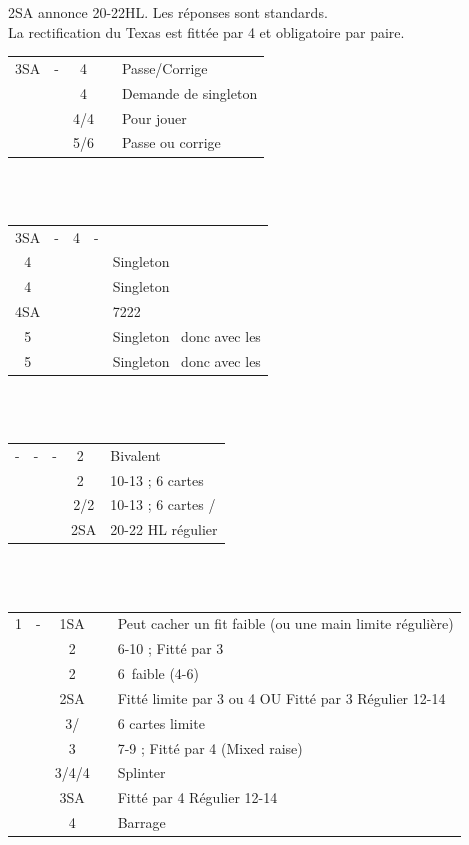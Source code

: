 \documentclass[a4paper, oneside, 11pt]{report}
\begin{document}
	2SA annonce 20-22HL. Les réponses sont standards. \\
La rectification du Texas est fittée par 4 et obligatoire par paire.\\

	\begin{tabular}{cccc|l}
	3SA & - & 4\trefle && Passe/Corrige\\
	&& 4\carreau && Demande de singleton\\
	&& 4\coeur/4\pique && Pour jouer\\
	&& 5\trefle/6\trefle && Passe ou corrige\\
	\end{tabular}\\\\
	
	\begin{tabular}{cccc|l}
	3SA & - & 4\carreau & - &\\
	4\coeur &&&& Singleton \coeur\\
	4\pique &&&& Singleton \pique\\
	4SA &&&& 7222\\
	5\trefle &&&& Singleton \carreau\ donc avec les \trefle\\
	5\carreau &&&& Singleton \trefle\ donc avec les \carreau\\
	\end{tabular}\\\\

	\begin{tabular}{cccc|l}
	- & - & - & 2\trefle\ & Bivalent\\
	&&& 2\carreau\ & 10-13 ; 6 cartes \carreau\\
	&&& 2\coeur/2\pique & 10-13 ; 6 cartes \coeur/\pique\\
	&&& 2SA & 20-22 HL régulier\\
	\end{tabular}\\\\
	
		\begin{tabular}{cccc|l}
		1\coeur & - & 1SA && Peut cacher un fit faible (ou une main limite régulière)\\
		&& 2\coeur && 6-10 ; Fitté par 3\\
		&& 2\pique && 6\pique\ faible (4-6)\\
		&& 2SA && Fitté limite par 3 ou 4 OU Fitté par 3 Régulier 12-14  \\
		&& 3\trefle/\carreau && 6 cartes limite\\
		&& 3\coeur && 7-9 ; Fitté par 4 (Mixed raise)\\
		&& 3\pique/4\trefle/4\carreau && Splinter\\
		&& 3SA && Fitté par 4 Régulier 12-14\\
		&& 4\coeur && Barrage\\
		\end{tabular}\\
\end{document}
